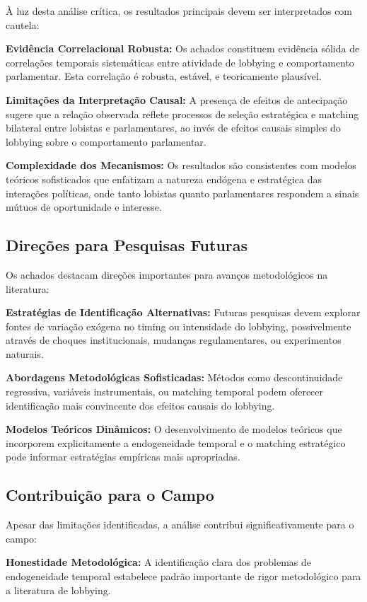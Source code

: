 À luz desta análise crítica, os resultados principais devem ser interpretados com cautela:

\textbf{Evidência Correlacional Robusta:} Os achados constituem evidência sólida de correlações temporais sistemáticas entre atividade de lobbying e comportamento parlamentar. Esta correlação é robusta, estável, e teoricamente plausível.

\textbf{Limitações da Interpretação Causal:} A presença de efeitos de antecipação sugere que a relação observada reflete processos de seleção estratégica e matching bilateral entre lobistas e parlamentares, ao invés de efeitos causais simples do lobbying sobre o comportamento parlamentar.

\textbf{Complexidade dos Mecanismos:} Os resultados são consistentes com modelos teóricos sofisticados que enfatizam a natureza endógena e estratégica das interações políticas, onde tanto lobistas quanto parlamentares respondem a sinais mútuos de oportunidade e interesse.

\subsection{Direções para Pesquisas Futuras}

Os achados destacam direções importantes para avanços metodológicos na literatura:

\textbf{Estratégias de Identificação Alternativas:} Futuras pesquisas devem explorar fontes de variação exógena no timing ou intensidade do lobbying, possivelmente através de choques institucionais, mudanças regulamentares, ou experimentos naturais.

\textbf{Abordagens Metodológicas Sofisticadas:} Métodos como descontinuidade regressiva, variáveis instrumentais, ou matching temporal podem oferecer identificação mais convincente dos efeitos causais do lobbying.

\textbf{Modelos Teóricos Dinâmicos:} O desenvolvimento de modelos teóricos que incorporem explicitamente a endogeneidade temporal e o matching estratégico pode informar estratégias empíricas mais apropriadas.

\subsection{Contribuição para o Campo}

Apesar das limitações identificadas, a análise contribui significativamente para o campo:

\textbf{Honestidade Metodológica:} A identificação clara dos problemas de endogeneidade temporal estabelece padrão importante de rigor metodológico para a literatura de lobbying.

